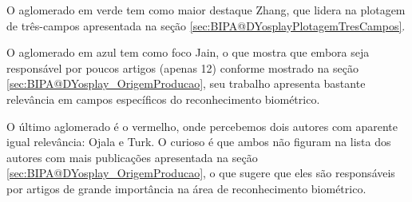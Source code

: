 O aglomerado em verde tem como maior destaque Zhang, que lidera na plotagem de três-campos apresentada na seção \ref{sec:BIPA@DYosplayPlotagemTresCampos}.

O aglomerado em azul tem como foco Jain, o que mostra que embora seja responsável por poucos artigos (apenas 12) conforme mostrado na seção \ref{sec:BIPA@DYosplay_OrigemProducao}, seu trabalho apresenta bastante relevância em campos específicos do reconhecimento biométrico.

O último aglomerado é o vermelho, onde percebemos dois autores com aparente igual relevância: Ojala e Turk. O curioso é que ambos não figuram na lista dos autores com mais publicações apresentada na seção \ref{sec:BIPA@DYosplay_OrigemProducao}, o que sugere que eles são responsáveis por artigos de grande importância na área de reconhecimento biométrico.

